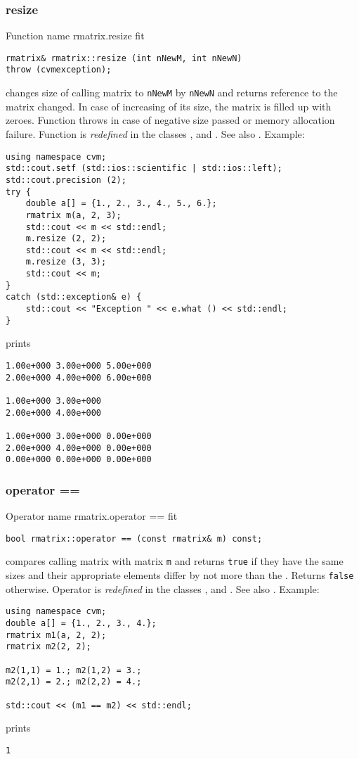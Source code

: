 \subsubsection{resize}
Function%
\pdfdest name {rmatrix.resize} fit
\begin{verbatim}
rmatrix& rmatrix::resize (int nNewM, int nNewN)
throw (cvmexception);
\end{verbatim}
changes  size of  calling matrix to \verb"nNewM" by \verb"nNewN"
and returns  reference to
the matrix changed. In case of increasing of its size, the matrix
is filled up with zeroes.
Function throws  
in case of negative size passed or memory allocation failure.
Function is \emph{redefined} in the classes
, 
and .
See also .
Example:
\begin{Verbatim}
using namespace cvm;
std::cout.setf (std::ios::scientific | std::ios::left);
std::cout.precision (2);
try {
    double a[] = {1., 2., 3., 4., 5., 6.};
    rmatrix m(a, 2, 3);
    std::cout << m << std::endl;
    m.resize (2, 2);
    std::cout << m << std::endl;
    m.resize (3, 3);
    std::cout << m;
}
catch (std::exception& e) {
    std::cout << "Exception " << e.what () << std::endl;
}
\end{Verbatim}
prints
\begin{Verbatim}
1.00e+000 3.00e+000 5.00e+000
2.00e+000 4.00e+000 6.00e+000

1.00e+000 3.00e+000
2.00e+000 4.00e+000

1.00e+000 3.00e+000 0.00e+000
2.00e+000 4.00e+000 0.00e+000
0.00e+000 0.00e+000 0.00e+000
\end{Verbatim}
\newpage




\subsubsection{operator ==}
Operator%
\pdfdest name {rmatrix.operator ==} fit
\begin{verbatim}
bool rmatrix::operator == (const rmatrix& m) const;
\end{verbatim}
compares  calling matrix with  matrix \verb"m"
and returns \verb"true" if they have the same sizes
and their appropriate elements differ by not more than the
.
Returns \verb"false" otherwise.
Operator is \emph{redefined} in the classes
, 
and .
See also .
Example:
\begin{Verbatim}
using namespace cvm;
double a[] = {1., 2., 3., 4.};
rmatrix m1(a, 2, 2);
rmatrix m2(2, 2);

m2(1,1) = 1.; m2(1,2) = 3.;
m2(2,1) = 2.; m2(2,2) = 4.;

std::cout << (m1 == m2) << std::endl;
\end{Verbatim}
prints
\begin{Verbatim}
1
\end{Verbatim}
\newpage




